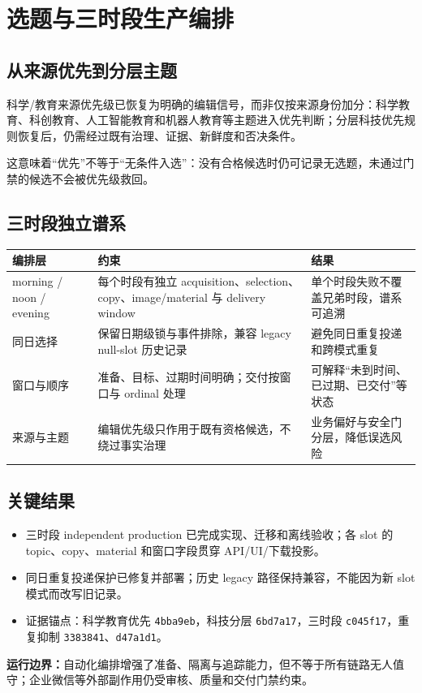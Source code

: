 \documentclass[UTF8,11pt,a4paper,fontset=none]{ctexart}
\begin{document}
\section{选题与三时段生产编排}
\subsection{从来源优先到分层主题}
\begin{focusbox}
科学/教育来源优先级已恢复为明确的编辑信号，而非仅按来源身份加分：科学教育、科创教育、人工智能教育和机器人教育等主题进入优先判断；分层科技优先规则恢复后，仍需经过既有治理、证据、新鲜度和否决条件。\par
这意味着“优先”不等于“无条件入选”：没有合格候选时仍可记录无选题，未通过门禁的候选不会被优先级救回。
\end{focusbox}
\subsection{三时段独立谱系}
\noindent\begin{tabularx}{\textwidth}{L{2.5cm}L{4.6cm}Y}\toprule
{}\color{white}\bfseries\sffamily 编排层&\color{white}\bfseries\sffamily 约束&\color{white}\bfseries\sffamily 结果\\\midrule
morning / noon / evening&每个时段有独立 acquisition、selection、copy、image/material 与 delivery window&单个时段失败不覆盖兄弟时段，谱系可追溯\\
同日选择&保留日期级锁与事件排除，兼容 legacy null-slot 历史记录&避免同日重复投递和跨模式重复\\
窗口与顺序&准备、目标、过期时间明确；交付按窗口与 ordinal 处理&可解释“未到时间、已过期、已交付”等状态\\
来源与主题&编辑优先级只作用于既有资格候选，不绕过事实治理&业务偏好与安全门分层，降低误选风险\\\bottomrule\end{tabularx}
\subsection{关键结果}
\begin{itemize}[leftmargin=2em,itemsep=0.25em]
\item 三时段 independent production 已完成实现、迁移和离线验收；各 slot 的 topic、copy、material 和窗口字段贯穿 API/UI/下载投影。
\item 同日重复投递保护已修复并部署；历史 legacy 路径保持兼容，不能因为新 slot 模式而改写旧记录。
\item 证据锚点：科学教育优先 \texttt{4bba9eb}，科技分层 \texttt{6bd7a17}，三时段 \texttt{c045f17}，重复抑制 \texttt{3383841}、\texttt{d47a1d1}。
\end{itemize}
\begin{boundarybox}
\textbf{运行边界：}自动化编排增强了准备、隔离与追踪能力，但不等于所有链路无人值守；企业微信等外部副作用仍受审核、质量和交付门禁约束。
\end{boundarybox}
\end{document}
